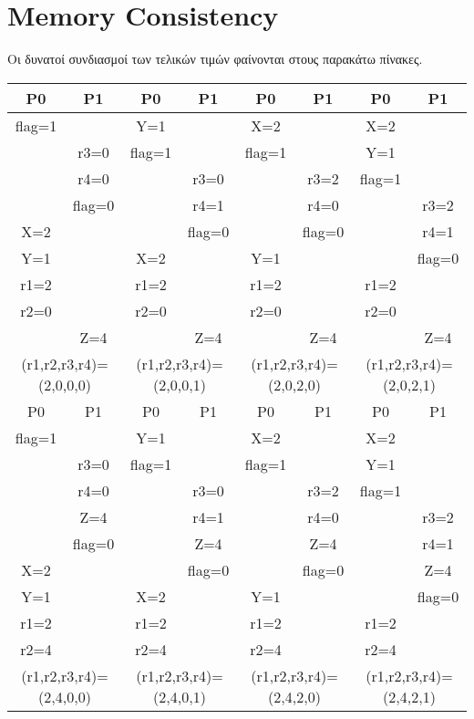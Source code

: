\documentclass[a4paper,12pt]{article}
\begin{document}
\section{Memory Consistency}
Οι δυνατοί συνδιασμοί των τελικών τιμών φαίνονται στους παρακάτω πίνακες.
\begin{table}[H]
    \centering
    \begin{tabular}{|c|c| |c|c| |c|c| |c|c|}
        \hline
        P0 &     P1 &       P0 &     P1 &       P0 &     P1 &      P0 &     P1       \\
        \hline
        flag=1 & &     Y=1 & &     X=2 & &    X=2 &         \\
               &    r3=0 &    flag=1 & &    flag=1 & &    Y=1 &                  \\
               &    r4=0 & &    r3=0 & &    r3=2 &   flag=1 &                  \\
               &   flag=0 & &    r4=1 & &    r4=0 & &    r3=2      \\
        X=2 & & &   flag=0 & &   flag=0 & &    r4=1      \\
        Y=1 & &    X=2 & &     Y=1 & & &   flag=0     \\
        r1=2 & &    r1=2 & &     r1=2 & &   r1=2 &               \\
        r2=0 & &    r2=0 & &     r2=0 & &   r2=0 &               \\
             &     Z=4 & &     Z=4 & &     Z=4 & &     Z=4      \\
        \hline
        \multicolumn{2}{|c||}{(r1,r2,r3,r4)=(2,0,0,0)} & \multicolumn{2}{|c||}{(r1,r2,r3,r4)=(2,0,0,1)} &
        \multicolumn{2}{|c||}{(r1,r2,r3,r4)=(2,0,2,0)} &   \multicolumn{2}{|c|}{(r1,r2,r3,r4)=(2,0,2,1)} \\
        \hline
        \hline
        P0 & P1 & P0 &        P1 &         P0 &  P1 &  P0 &  P1       \\
        \hline
        flag=1 & &    Y=1 & &   X=2 & &      X=2 &               \\
               &  r3=0 &   flag=1 & &  flag=1 & &      Y=1 &               \\
               &  r4=0 & &   r3=0 & &     r3=2 &     flag=1 &               \\
               &   Z=4 & &   r4=1 & &     r4=0 & &      r3=2     \\
               & flag=0 & &    Z=4 & &      Z=4 & &      r4=1     \\
        X=2 & & &  flag=0 & &    flag=0 & &       Z=4     \\
        Y=1 & &    X=2 & &   Y=1 & & &     flag=0    \\
        r1=2 & &    r1=2 & &   r1=2 & &      r1=2 &               \\
        r2=4 & &    r2=4 & &   r2=4 & &      r2=4 &               \\
        \hline
        \multicolumn{2}{|c||}{(r1,r2,r3,r4)=(2,4,0,0)} &   \multicolumn{2}{|c||}{(r1,r2,r3,r4)=(2,4,0,1)} &
        \multicolumn{2}{|c||}{(r1,r2,r3,r4)=(2,4,2,0)} &   \multicolumn{2}{|c|}{(r1,r2,r3,r4)=(2,4,2,1)} \\
        \hline
    \end{tabular}
\end{table}
\end{document}
